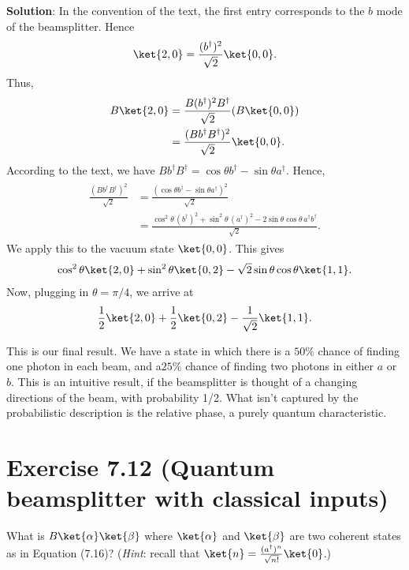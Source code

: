 \documentclass{book}
\begin{document}
    \textbf{Solution}: In the convention of the text, the first entry corresponds to the $b$ mode of the beamsplitter. Hence
    \begin{align}
        \ket{2,0} = \frac{(b^\dagger)^2}{\sqrt{2}} \ket{0,0}.
    \end{align}
    Thus,
    \begin{align}
    \begin{aligned}
        B\ket{2,0} &= \frac{B (b^\dagger)^2 B^
        \dagger}{\sqrt{2}} (B \ket{0,0}) \\
        &= \frac{(B b^\dagger B^\dagger)^2}{\sqrt{2}} \ket{0,0}.
    \end{aligned}
    \end{align}
    According to the text, we have $B b^\dagger B^\dagger = \cos \theta b^\dagger - \sin\theta a^\dagger$. Hence,
    \begin{align}
    \begin{aligned}
        \frac{(Bb^\dagger B^\dagger)^2}{\sqrt{2}} &= \frac{(\cos \theta b^\dagger - \sin\theta a^\dagger)^2}{\sqrt{2}} \\
        &= \frac{\cos^2 \theta\, (b^\dagger)^2 + \sin^2 \theta\,(a^\dagger)^2 - 2 \sin\theta \cos\theta\, a^\dagger b^\dagger}{\sqrt{2}}.
    \end{aligned}
    \end{align}
    We apply this to the vacuum state $\ket{0,0}$. This gives
    \begin{align}
        \cos^2 \theta \ket{2,0} + \sin^2 \theta \ket{0,2} - \sqrt{2} \sin\theta \cos\theta \ket{1,1}.
    \end{align}
    Now, plugging in $\theta = \pi/4$, we arrive at 
    \begin{align}
        \frac{1}{2}\ket{2,0} + \frac{1}{2} \ket{0,2} - \frac{1}{\sqrt{2}} \ket{1,1}.
    \end{align}
    
    This is our final result. We have a state in which there is a $50\%$ chance of finding one photon in each beam, and a$25\%$ chance of finding two photons in either $a$ or $b$. This is an intuitive result, if the beamsplitter is thought of a changing directions of the beam, with probability 1/2. What isn't captured by the probabilistic description is the relative phase, a purely quantum characteristic.

\section*{Exercise 7.12 (Quantum beamsplitter with classical inputs)}
    What is $B\ket{\alpha}\ket{\beta}$ where $\ket{\alpha}$ and $\ket{\beta}$ are two coherent states as in Equation (7.16)? (\emph{Hint}: recall that $\ket{n} = \frac{(a^\dagger)^n}{\sqrt{n!}}\ket{0}$.)
\end{document}
